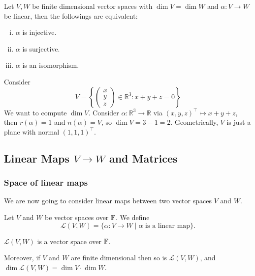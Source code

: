 \documentclass[a4paper,11pt]{article}
\begin{document}
\begin{corollary}
    Let $V,W$ be finite dimensional vector spaces with $\dim V=\dim W$ and $\alpha:V\to W$ be linear, then the followings are equivalent:
    \begin{enumerate}[(i)]
        \item $\alpha$ is injective.
        \item $\alpha$ is surjective.
        \item $\alpha$ is an isomorphism.
    \end{enumerate}
\end{corollary}
\begin{example}
    Consider
    $$V=\left\{ \begin{pmatrix}
        x\\
        y\\
        z
    \end{pmatrix}\in\mathbb R^3:x+y+z=0\right\}$$
    We want to compute $\dim V$.
    Consider $\alpha:\mathbb R^3\to\mathbb R$ via $(x,y,z)^\top\mapsto x+y+z$, then $r(\alpha)=1$ and $n(\alpha)=V$, so $\dim V=3-1=2$.
    Geometrically, $V$ is just a plane with normal $(1,1,1)^\top$.
\end{example}

\subsection{Linear Maps \texorpdfstring{$V \rightarrow W$}{V to W} and Matrices}
\subsubsection*{Space of linear maps}
We are now going to consider linear maps between two vector spaces $V$ and $W$.

\begin{definition}
    Let $V$ and $W$ be vector spaces over ${\mathbb{F}}$. We define
    $$
    \mathcal{L}(V, W) = \{\alpha: V \rightarrow W \mid \alpha \text{ is a linear map}\}.
    $$
\end{definition}
\begin{proposition}
    $\mathcal{L}(V, W)$ is a vector space over ${\mathbb{F}}$.
    
    Moreover, if $V$ and $W$ are finite dimensional then so is $\mathcal{L}(V, W)$, and $\dim \mathcal{L}(V, W) = \dim V \cdot \dim W$.
\end{proposition}
\end{document}
